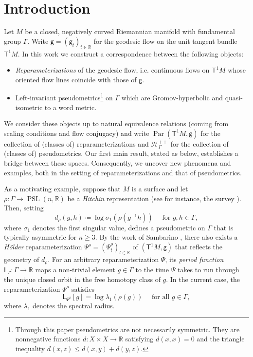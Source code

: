 \documentclass[twoside]{amsart}
\theoremstyle{definition}
\numberwithin{equation}{section}
\numberwithin{theorem}{section}
\newcommand{\msf}[1]{\mathsf{#1}}
\newcommand{\R}{\mathbb{R}}
\newcommand{\scrH}{\mathscr{H}}
\newcommand{\G}{\Gamma}
\newcommand{\lam}{\lambda}
\newcommand{\sig}{\sigma}
\DeclareMathOperator{\PSL}{PSL}
\DeclareMathOperator{\Par}{Par}
\newcommand{\ra}{\rightarrow}
\newcommand{\sfP}{\mathsf{\Psi}}
\begin{document}
\section{Introduction}
Let $M$ be a closed, negatively curved Riemannian manifold with fundamental group $\G$. Write $\msf{g}=(\msf{g}_t)_{t\in \R}$ for the geodesic flow on the unit tangent bundle $\msf{T}^1 M$. In this work we construct a correspondence between %
the following objects:
\begin{itemize}
    \item \emph{Reparameterizations} of the geodesic flow, i.e. continuous flows on $\msf{T}^1 M$ whose oriented flow lines coincide with those of $\msf{g}$.
    \item Left-invariant pseudometrics\footnote{Through this paper pseudometrics are not necessarily symmetric. They are nonnegative functions $d:X\times X\ra \R$ satisfying $d(x,x)=0$ and the triangle inequality $d(x,z)\leq d(x,y)+d(y,z)$.}  on $\G$ which are Gromov-hyperbolic and quasi-isometric to a word metric.
\end{itemize}
We consider these objects up to natural equivalence relations (coming from scaling conditions and flow conjugacy) and write $\Par(\msf{T}^1 M,\msf{g})$ for the collection of (classes of) reparameterizations and $\scrH_\G^{++}$ for the collection of (classes of) pseudometrics.
 Our first main result, stated as  below, establishes a bridge between these spaces. Consequently, we uncover new phenomena and examples, both in the setting of reparameterizations and that of pseudometrics. %

As a motivating example, suppose that $M$ is a surface and let $\rho:\G\ra \PSL(n,\R)$ be a \emph{Hitchin} representation (see for instance, the survey \cite{wienhard.ICM}). Then, setting
\begin{equation}\label{eq:dHitchin}
    d_{\rho}(g,h) \coloneq \log \sigma_1(\rho(g^{-1}h)) \quad \text{ for }g,h\in \G,
\end{equation}
where $\sig_1$ denotes the first singular value, defines a pseudometric on $\G$ that is typically asymmetric for $n\geq 3$. By the work of Sambarino \cite{sambarino.quantitative,sambarino.orbital}, there also exists a \emph{H\"older} reparameterization $\sfP^\rho=(\sfP_t^\rho)_{t\in \R}$ of $(\msf{T}^1M,\msf{g})$ that reflects the geometry of $d_{\rho}$. For an arbitrary reparameterization $\sfP$, its \emph{period function} $\msf{L}_\sfP:\G \ra \R$ maps a non-trivial element $g\in \G$ to the time $\sfP$ takes to run through the unique closed orbit in the free homotopy class of $g$. In the current case, the reparameterization $\sfP^\rho$ satisfies
\[
\msf{L}_{\sfP^\rho}[g]=\log \lam_1(\rho(g)) \quad \text{ for all } g\in \G,
\]
where $\lam_1$ denotes the spectral radius.
\end{document}
